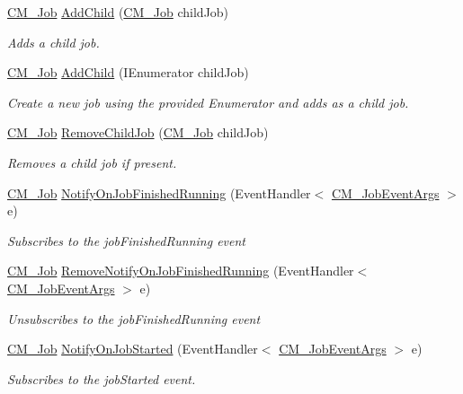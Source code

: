 \begin{DoxyCompactItemize}
\hyperlink{class_c_m___job}{C\+M\+\_\+\+Job} \hyperlink{class_c_m___job_aa71a7f4fa664df6b7dd8f33f431f9935}{Add\+Child} (\hyperlink{class_c_m___job}{C\+M\+\_\+\+Job} child\+Job)
\begin{DoxyCompactList}\small\item\em Adds a child job. \end{DoxyCompactList}\item 
\hyperlink{class_c_m___job}{C\+M\+\_\+\+Job} \hyperlink{class_c_m___job_a9852216469080219798b397645d85767}{Add\+Child} (I\+Enumerator child\+Job)
\begin{DoxyCompactList}\small\item\em Create a new job using the provided Enumerator and adds as a child job. \end{DoxyCompactList}\item 
\hyperlink{class_c_m___job}{C\+M\+\_\+\+Job} \hyperlink{class_c_m___job_aaa110693cfb8ab6b8e35b7dafece2d32}{Remove\+Child\+Job} (\hyperlink{class_c_m___job}{C\+M\+\_\+\+Job} child\+Job)
\begin{DoxyCompactList}\small\item\em Removes a child job if present. \end{DoxyCompactList}\item 
\hyperlink{class_c_m___job}{C\+M\+\_\+\+Job} \hyperlink{class_c_m___job_a7b169aa2419e1b14bc5af2ef47bfbbe6}{Notify\+On\+Job\+Finished\+Running} (Event\+Handler$<$ \hyperlink{class_c_m___job_event_args}{C\+M\+\_\+\+Job\+Event\+Args} $>$ e)
\begin{DoxyCompactList}\small\item\em Subscribes to the job\+Finished\+Running event \end{DoxyCompactList}\item 
\hyperlink{class_c_m___job}{C\+M\+\_\+\+Job} \hyperlink{class_c_m___job_a0180557e1cfa03cf4a580f11711bb783}{Remove\+Notify\+On\+Job\+Finished\+Running} (Event\+Handler$<$ \hyperlink{class_c_m___job_event_args}{C\+M\+\_\+\+Job\+Event\+Args} $>$ e)
\begin{DoxyCompactList}\small\item\em Unsubscribes to the job\+Finished\+Running event \end{DoxyCompactList}\item 
\hyperlink{class_c_m___job}{C\+M\+\_\+\+Job} \hyperlink{class_c_m___job_a144f7f4f50fc9e78cb3cc89948b43781}{Notify\+On\+Job\+Started} (Event\+Handler$<$ \hyperlink{class_c_m___job_event_args}{C\+M\+\_\+\+Job\+Event\+Args} $>$ e)
\begin{DoxyCompactList}\small\item\em Subscribes to the job\+Started event. \end{DoxyCompactList}\item 

\end{DoxyCompactItemize}
